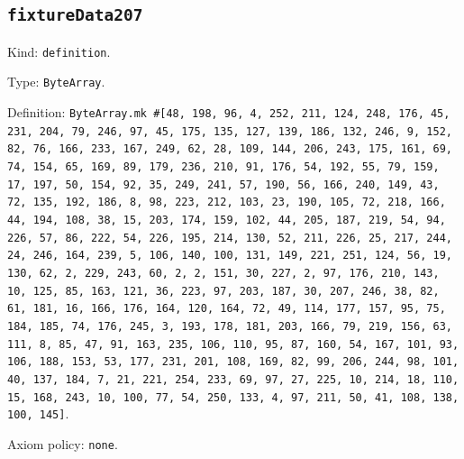 \documentclass[11pt]{article}
\begin{document}
\subsection*{\texttt{fixtureData207}}
\noindent Kind: \texttt{definition}.\par
\noindent Type: \texttt{ByteArray}.\par
\noindent Definition: \texttt{ByteArray.mk \#[48, 198, 96, 4, 252, 211, 124, 248, 176, 45, 231, 204, 79, 246, 97, 45, 175, 135, 127, 139, 186, 132, 246, 9, 152, 82, 76, 166, 233, 167, 249, 62, 28, 109, 144, 206, 243, 175, 161, 69, 74, 154, 65, 169, 89, 179, 236, 210, 91, 176, 54, 192, 55, 79, 159, 17, 197, 50, 154, 92, 35, 249, 241, 57, 190, 56, 166, 240, 149, 43, 72, 135, 192, 186, 8, 98, 223, 212, 103, 23, 190, 105, 72, 218, 166, 44, 194, 108, 38, 15, 203, 174, 159, 102, 44, 205, 187, 219, 54, 94, 226, 57, 86, 222, 54, 226, 195, 214, 130, 52, 211, 226, 25, 217, 244, 24, 246, 164, 239, 5, 106, 140, 100, 131, 149, 221, 251, 124, 56, 19, 130, 62, 2, 229, 243, 60, 2, 2, 151, 30, 227, 2, 97, 176, 210, 143, 10, 125, 85, 163, 121, 36, 223, 97, 203, 187, 30, 207, 246, 38, 82, 61, 181, 16, 166, 176, 164, 120, 164, 72, 49, 114, 177, 157, 95, 75, 184, 185, 74, 176, 245, 3, 193, 178, 181, 203, 166, 79, 219, 156, 63, 111, 8, 85, 47, 91, 163, 235, 106, 110, 95, 87, 160, 54, 167, 101, 93, 106, 188, 153, 53, 177, 231, 201, 108, 169, 82, 99, 206, 244, 98, 101, 40, 137, 184, 7, 21, 221, 254, 233, 69, 97, 27, 225, 10, 214, 18, 110, 15, 168, 243, 10, 100, 77, 54, 250, 133, 4, 97, 211, 50, 41, 108, 138, 100, 145]}.\par
\noindent Axiom policy: \texttt{none}.\par
\end{document}
